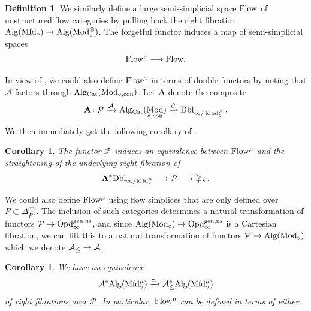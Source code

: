 \documentclass[10pt]{amsart}
\numberwithin{equation}{section}
\newtheorem{cor}[prop]{Corollary}
\theoremstyle{definition}
\newtheorem{definition}[prop]{Definition}
\DeclareMathOperator{\Mod}{Mod}
\DeclareMathOperator{\op}{op}
\DeclareMathOperator{\con}{con}
\newcommand{\PreFlow}{\mathrm{Flow}\vphantom{w}}
\newcommand{\Cat}{\mathrm{Cat}\vphantom{t}}
\newcommand{\Mfd}{\mathrm{Mfd}\vphantom{d}}
\newcommand{\Alg}{\mathrm{Alg}\vphantom{z}}
\newcommand{\Simp}{\mathbb{\Delta}}
\newcommand{\cA}{\mathcal{A}}
\newcommand{\cP}{\mathcal{P}}
\newcommand{\cF}{\mathcal{F}}
\newcommand{\bfA}{\mathbf{A}}
\newcommand{\Opd}{\mathrm{Opd}^{\mathrm{gen,ns}}_{\infty}}
\newcommand{\Dbl}{\mathrm{Dbl}}
\newcommand{\del}{\partial}
\renewcommand{\to}{\mathchoice{\longrightarrow}{\rightarrow}{}{}}
\begin{document}
\begin{definition}\label{def:PreFlow}
	We similarly define a large semi-simplicial space $\PreFlow$ of unstructured flow categories by pulling back the right fibration $\Alg(\Mfd_{\diamond})\to \Alg(\Mod_{\diamond}^{\otimes})$.
  The forgetful functor induces a map of semi-simplicial spaces
	\begin{align*}
		\PreFlow^{\mu} \to \PreFlow.
	\end{align*}
\end{definition}

In view of , we could also define $\PreFlow^{\mu}$ in terms of double functors by noting that $\cA$ factors through $\Alg_{\Cat}(\Mod_{\diamond,\con})$.
Let $\bfA$ denote the composite
\begin{align*}
	\bfA\colon \cP \xrightarrow{\cA} \Alg_{\Cat}(\Mod_{\diamond,\con}) \xrightarrow{\del} \Dbl_{\infty/\Mod_{\diamond}^{\otimes}} \, .
\end{align*}
We then immediately get the following corollary of .

\begin{cor}\label{cor:flow_cats_are_double_functors}
	The functor $\cF$ induces an equivalence between $\PreFlow^{\mu}$ and the straightening of the underlying right fibration of
	\begin{align*}
		\bfA^{*}\Dbl_{\infty/\Mfd_{\diamond}^{\mu}} \to \cP \to \Simp_{s} \,.
	\end{align*}
\end{cor}

We could also define $\PreFlow^{\mu}$ using flow simplices that are only defined over $P\subset \Simp^{\op}_{P^{\simeq}}$.
The inclusion of such categories determines a natural transformation of functors $\cP \to \Opd$, and since $\Alg(\Mod_{\diamond}) \to \Opd$ is a Cartesian fibration, we can lift this to a natural transformation of functors $\cP \to \Alg(\Mod_{\diamond})$ which we denote $\cA_{\leq} \to \cA$.
\begin{cor}\label{cor:flow_cats_defined_on_P}
	We have an equivalence
	\begin{align}\label{eq:flow_cats_defined_on_P}
		\cA^{*}\Alg(\Mfd^{\mu}_{\diamond}) \xrightarrow{\simeq}   \cA_{\leq}^{*}\Alg(\Mfd^{\mu}_{\diamond})
	\end{align}
	of right fibrations over $\cP$.
  In particular, $\PreFlow^{\mu}$ can be defined in terms of either.
\end{cor}
\end{document}
